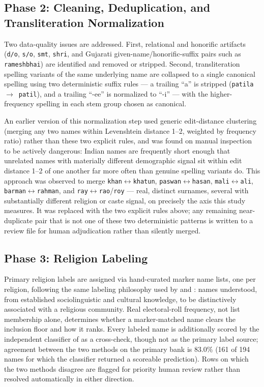 \documentclass[11pt]{article}
\begin{document}
\subsection{Phase 2: Cleaning, Deduplication, and Transliteration Normalization}
\label{sec:phase2}

Two data-quality issues are addressed. First, relational and honorific artifacts (\texttt{d/o}, \texttt{s/o}, \texttt{smt}, \texttt{shri}, and Gujarati given-name/honorific-suffix pairs such as \texttt{rameshbhai}) are identified and removed or stripped. Second, transliteration spelling variants of the same underlying name are collapsed to a single canonical spelling using two deterministic suffix rules --- a trailing ``a'' is stripped (\texttt{patila}~$\rightarrow$~\texttt{patil}), and a trailing ``-ee'' is normalized to ``-i'' --- with the higher-frequency spelling in each stem group chosen as canonical.

An earlier version of this normalization step used generic edit-distance clustering (merging any two names within Levenshtein distance 1--2, weighted by frequency ratio) rather than these two explicit rules, and was found on manual inspection to be actively dangerous: Indian names are frequently short enough that unrelated names with materially different demographic signal sit within edit distance 1--2 of one another far more often than genuine spelling variants do. This approach was observed to merge \texttt{khan}$\leftrightarrow$\texttt{khatun}, \texttt{paswan}$\leftrightarrow$\texttt{hasan}, \texttt{mali}$\leftrightarrow$\texttt{ali}, \texttt{barman}$\leftrightarrow$\texttt{rahman}, and \texttt{ray}$\leftrightarrow$\texttt{rao}/\texttt{roy} --- real, distinct surnames, several with substantially different religion or caste signal, on precisely the axis this study measures. It was replaced with the two explicit rules above; any remaining near-duplicate pair that is not one of these two deterministic patterns is written to a review file for human adjudication rather than silently merged.

\subsection{Phase 3: Religion Labeling}
\label{sec:phase3}

Primary religion labels are assigned via hand-curated marker name lists, one per religion, following the same labeling philosophy used by \citet{thoratAttewell2007} and \citet{banerjee2009}: names understood, from established sociolinguistic and cultural knowledge, to be distinctively associated with a religious community. Real electoral-roll frequency, not list membership alone, determines whether a marker-matched name clears the inclusion floor and how it ranks. Every labeled name is additionally scored by the independent classifier of \citet{chaturvedi2023} as a cross-check, though not as the primary label source; agreement between the two methods on the primary bank is 83.0\% (161 of 194 names for which the classifier returned a scoreable prediction). Rows on which the two methods disagree are flagged for priority human review rather than resolved automatically in either direction.
\end{document}
